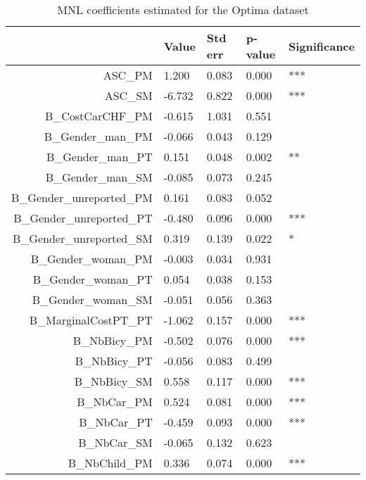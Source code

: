 \begin{table}
\centering
\caption{MNL coefficients estimated for the Optima dataset}
\label{tab:experiment_5_MNL_coefs_Optima}
\begin{tabular}{rllll}
\toprule
{} &  Value &  Std err &  p-value & Significance \\
\midrule
ASC\_PM                    &  1.200 &    0.083 &    0.000 &          *** \\
ASC\_SM                    & -6.732 &    0.822 &    0.000 &          *** \\
B\_CostCarCHF\_PM          & -0.615 &    1.031 &    0.551 &              \\
B\_Gender\_man\_PM         & -0.066 &    0.043 &    0.129 &              \\
B\_Gender\_man\_PT         &  0.151 &    0.048 &    0.002 &           ** \\
B\_Gender\_man\_SM         & -0.085 &    0.073 &    0.245 &              \\
B\_Gender\_unreported\_PM  &  0.161 &    0.083 &    0.052 &              \\
B\_Gender\_unreported\_PT  & -0.480 &    0.096 &    0.000 &          *** \\
B\_Gender\_unreported\_SM  &  0.319 &    0.139 &    0.022 &            * \\
B\_Gender\_woman\_PM       & -0.003 &    0.034 &    0.931 &              \\
B\_Gender\_woman\_PT       &  0.054 &    0.038 &    0.153 &              \\
B\_Gender\_woman\_SM       & -0.051 &    0.056 &    0.363 &              \\
B\_MarginalCostPT\_PT      & -1.062 &    0.157 &    0.000 &          *** \\
B\_NbBicy\_PM              & -0.502 &    0.076 &    0.000 &          *** \\
B\_NbBicy\_PT              & -0.056 &    0.083 &    0.499 &              \\
B\_NbBicy\_SM              &  0.558 &    0.117 &    0.000 &          *** \\
B\_NbCar\_PM               &  0.524 &    0.081 &    0.000 &          *** \\
B\_NbCar\_PT               & -0.459 &    0.093 &    0.000 &          *** \\
B\_NbCar\_SM               & -0.065 &    0.132 &    0.623 &              \\
B\_NbChild\_PM             &  0.336 &    0.074 &    0.000 &          *** \\

\end{tabular}
\end{table}
